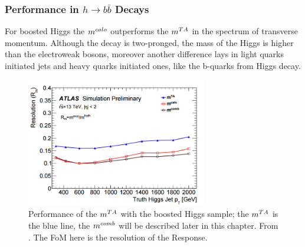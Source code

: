 \subsubsection{Performance in $h\to b\bar{b}$ Decays}

For boosted Higgs the $m^{calo}$ outperforms the $\mta$ in the spectrum of transverse momentum. Although the decay is two-pronged, the mass of the Higgs is higher than the electroweak bosons, moreover another difference lays in light quarks initiated jets and heavy quarks initiated ones, like the b-quarks from Higgs decay.

\begin{figure}[!ht]
  \centering
      \includegraphics[width=0.7\textwidth]{jet_part/mta/higgsmta.png}
  \caption[Performance of the $\mta$ with the boosted Higgs sample]{Performance of the $\mta$ with the boosted Higgs sample; the $\mta$ is the blue line, the $m^{comb}$ will be described later in this chapter. From \cite{art39}. The FoM here is the resolution of the Response.}
  \label{fig:mta4}
\end{figure}



